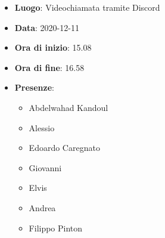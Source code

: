 \begin{itemize}
    \item \textbf{Luogo}: Videochiamata tramite Discord
    \item \textbf{Data}: 2020-12-11
    \item \textbf{Ora di inizio}: 15.08
    \item \textbf{Ora di fine}: 16.58
    \item \textbf{Presenze}:
          \begin{itemize}
              \item Abdelwahad Kandoul
              \item Alessio 
              \item Edoardo Caregnato
              \item Giovanni
              \item Elvis
              \item Andrea
              \item Filippo Pinton
          \end{itemize}
\end{itemize}